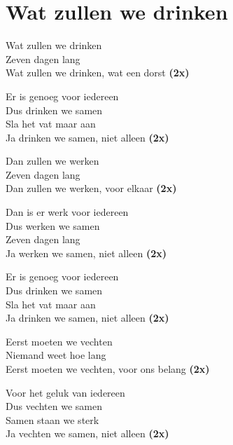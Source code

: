 \section{Wat zullen we drinken}
Wat zullen we drinken \\
Zeven dagen lang \\
Wat zullen we drinken, wat een dorst \textbf{(2x)}

Er is genoeg voor iedereen \\
Dus drinken we samen \\
Sla het vat maar aan \\
Ja drinken we samen, niet alleen \textbf{(2x)}

Dan zullen we werken \\
Zeven dagen lang \\
Dan zullen we werken, voor elkaar \textbf{(2x)}

Dan is er werk voor iedereen \\
Dus werken we samen \\
Zeven dagen lang \\
Ja werken we samen, niet alleen \textbf{(2x)}

Er is genoeg voor iedereen \\
Dus drinken we samen \\
Sla het vat maar aan \\
Ja drinken we samen, niet alleen \textbf{(2x)}

Eerst moeten we vechten \\
Niemand weet hoe lang \\
Eerst moeten we vechten, voor ons belang \textbf{(2x)}

Voor het geluk van iedereen \\
Dus vechten we samen \\
Samen staan we sterk \\
Ja vechten we samen, niet alleen \textbf{(2x)}